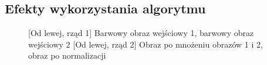 \documentclass[a4paper,12pt, titlepage]{report}
\begin{document}
\subsection*{Efekty wykorzystania algorytmu}
\begin{figure}[h]
    \centering
    \qquad
    \caption{[Od lewej, rząd 1] Barwowy obraz wejściowy 1, barwowy obraz wejściowy 2 [Od lewej, rząd 2] Obraz po mnożeniu obrazów 1 i 2, obraz po normalizacji}%
    \label{fig:geo_after_grey1}%
\end{figure}
\FloatBarrier
\end{document}
